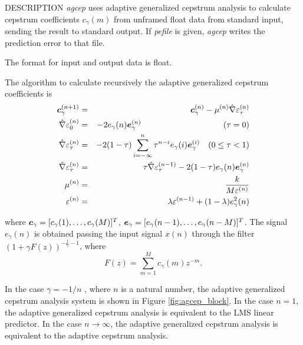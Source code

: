 \begin{qsection}{DESCRIPTION}
	{\em agcep} uses adaptive generalized cepstrum analysis
	\cite{ref:agcep-IEICEtaikai90s}
	to calculate cepstrum coefficients $c_\gamma(m)$ 
	from unframed float data from standard input,
	sending the result to standard output. 
	If {\em pefile} is given, 
	{\em agcep} writes the prediction error to that file.

	The format for input and output data is float.

	The algorithm to calculate recursively the
        adaptive generalized cepstrum coefficients is 
\begin{eqnarray*}
  \mbox{\boldmath $c$}_\gamma^{(n+1)} &=& \mbox{\boldmath $c$}_\gamma^{(n)} 
     - \mu^{(n)} \hat{\nabla} \varepsilon_{\tau}^{(n)} \\
  \hat{\nabla} \varepsilon_{0}^{(n)} &=& -2 e_\gamma (n) \mbox{\boldmath $e$}_\gamma^{(n)} \hspace{3.5cm} ( \tau = 0 )\\
  \hat{\nabla} \varepsilon_{\tau}^{(n)} &=& -2 (1 - \tau) \sum_{i=-\infty}^{n} \tau^{n-i} e_\gamma (i) \mbox{\boldmath $e$}_\gamma^{(i)} ~~~ ( 0 \le \tau < 1 )\\
  \hat{\nabla} \varepsilon_{\tau}^{(n)} &=& \tau \hat{\nabla} \varepsilon_{\tau}^{(n-1)} - 2 (1 - \tau) e_\gamma (n) \mbox{\boldmath $e$}_\gamma^{(n)} \\
  \mu^{(n)} &=& \frac{k}{M \varepsilon^{(n)}} \\
  \varepsilon^{(n)} &=& \lambda \varepsilon^{(n-1)}
     + (1-\lambda)e_\gamma^2(n)
\end{eqnarray*}	

where
$\mbox{\boldmath$c$}_\gamma = [c_\gamma(1),\ldots,c_\gamma(M)]^T$,
$\mbox{\boldmath$e$}_\gamma = [e_\gamma(n-1),\ldots,e_\gamma(n-M)]^T$.
The signal $e_\gamma(n)$ is obtained passing the input signal
 $x(n)$ through the filter $(1+\gamma F(z))^{-\frac{1}{\gamma}-1}$,
where 
\begin{displaymath}
F(z) = \sum_{m=1}^{M}c_\gamma(m)z^{-m}.
\end{displaymath}
\par
In the case $\gamma = -1/n$ , where $n$ is a natural number,
the adaptive generalized cepstrum analysis system is shown in 
Figure \ref{fig:agcep_block}.
In the case $n=1$, the adaptive generalized cepstrum
analysis is equivalent to the LMS linear predictor.
In the case $n \rightarrow \infty$,
the adaptive generalized cepstrum
analysis is equivalent to the 
adaptive cepstrum analysis.


\end{qsection}
